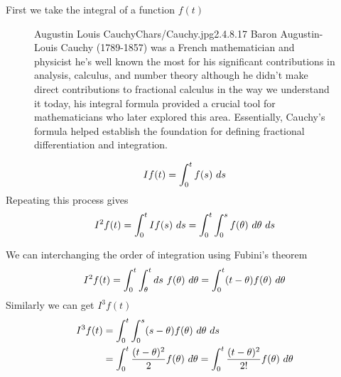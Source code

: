 First we take the integral of a function $f(t)$
\begin{figure*}[b]
    \begin{minipage}[h]{\textwidth}
        \begin{enrichment}{Augustin Louis Cauchy}{Chars/Cauchy.jpg}{2.4}{.8}{.17}
            Baron Augustin-Louis Cauchy (1789-1857) was a French mathematician and physicist 
            he's well known the most for his significant contributions in analysis, calculus, and number theory 
            although he didn't make direct contributions to fractional calculus in the way we understand 
            it today, his integral formula provided a crucial tool for mathematicians who later 
            explored this area. 
            Essentially, Cauchy's formula helped establish the foundation for defining fractional 
            differentiation and integration.
        \end{enrichment} 
    \end{minipage}
\end{figure*}
\[
    If(t) = \int_{0}^{t} f(s) \,\, ds
\]
Repeating this process gives 
\[
    I^2 f(t) = \int_{0}^{t} If(s) \,\, ds  = \int_{0}^{t}\int_{0}^{s} f(\theta) \,\, d\theta \,\, ds 
\]
\begin{minipage}[t][.18\textheight]{\textwidth}
    \begin{wrapfigure}{r}{0.2\textwidth}
    \end{wrapfigure}
We can interchanging the order of integration using Fubini's theorem
\[
    I^2 f(t) = \int_{0}^{t}\int_{\theta}^{t} ds \,\, f(\theta) \,\, d\theta = \int_{0}^{t}(t-\theta)f(\theta) \,\, d\theta
\]
Similarly we can get $I^3f(t)$
\begin{align*}
    I^3 f(t) &= \int_{0}^{t} \int_{0}^{s} (s-\theta)f(\theta) \,\, d\theta \,\, ds
             \\
             &= \int_{0}^{t} \frac{(t-\theta)^2}{2}f(\theta) \,\, d\theta = \int_{0}^{t} \frac{(t-\theta)^2}{2!}f(\theta) \,\, d\theta
\end{align*}
\end{minipage}

